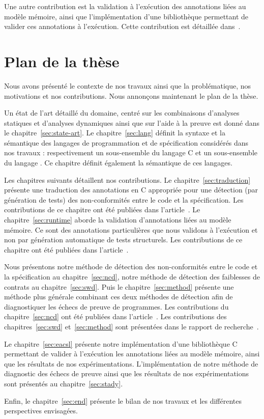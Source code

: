 Une autre contribution est la validation à l'exécution des annotations \acsl
liées au modèle mémoire, ainsi que l'implémentation d'une bibliothèque
permettant de valider ces annotations à l'exécution.
Cette contribution est détaillée dans~\cite{Kosmatov/RV13}. 


\section{Plan de la thèse}
\label{sec:plan}


Nous avons présenté le contexte de nos travaux ainsi que la problématique, nos
motivations et nos contributions.
Nous annonçons maintenant le plan de la thèse.

Un état de l'art détaillé du domaine, centré sur les combinaisons d'analyses
statiques et d'analyses dynamiques ainsi que sur l'aide à la preuve est
donné dans le chapitre~\ref{sec:state-art}.
Le chapitre~\ref{sec:lang} définit la syntaxe et la sémantique des langages de
programmation et de spécification considérés dans nos travaux : respectivement
un sous-ensemble du langage C et un sous-ensemble du langage \acsl.
Ce chapitre définit également la sémantique de ces langages.

Les chapitres suivants détaillent nos contributions.
Le chapitre~\ref{sec:traduction} présente une traduction des annotations \acsl
en C appropriée pour une détection (par génération de tests) des non-conformités
entre le code et la spécification.
Les contributions de ce chapitre ont été publiées dans
l'article~\cite{Petiot/SCAM14}.
Le chapitre~\ref{sec:runtime} aborde la validation d'annotations \acsl liées au
modèle mémoire.
Ce sont des annotations particulières que nous validons à l'exécution et non
par génération automatique de tests structurels.
Les contributions de ce chapitre ont été publiées dans
l'article~\cite{Kosmatov/RV13}.

Nous présentons notre méthode de détection des non-conformités entre le code et
la spécification au chapitre~\ref{sec:ncd}, notre méthode de détection des
faiblesses de contrats au chapitre~\ref{sec:swd}.
Puis le chapitre~\ref{sec:method} présente une méthode plus générale combinant
ces deux méthodes de détection afin de diagnostiquer les échecs de preuve de
programmes.
Les contributions du chapitre~\ref{sec:ncd} ont été publiées dans
l'article~\cite{Petiot/TAP14}.
Les contributions des chapitres~\ref{sec:swd} et~\ref{sec:method} sont
présentées dans le rapport de recherche~\cite{Petiot/unpublished15}.

Le chapitre~\ref{sec:eacsl} présente notre implémentation d'une bibliothèque C
permettant de valider à l'exécution les annotations \acsl liées au modèle
mémoire, ainsi que les résultats de nos expérimentations.
L'implémentation de notre méthode de diagnostic des échecs de preuve ainsi
que les résultats de nos expérimentations sont présentés au
chapitre~\ref{sec:stady}.

Enfin, le chapitre~\ref{sec:end} présente le bilan de nos travaux et les
différentes perspectives envisagées.
